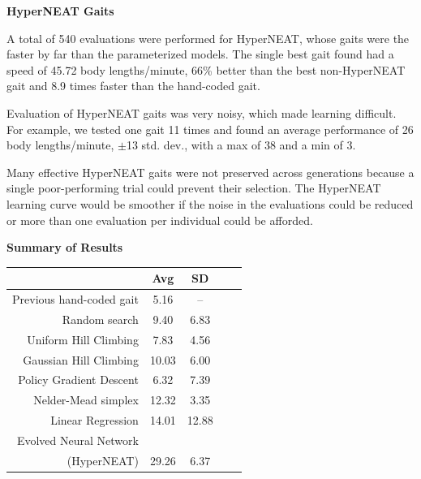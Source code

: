 \documentclass[portrait,final]{baposter}
\begin{document}
\begin{poster}
{


\textbf{HyperNEAT Gaits}
\vspace{.5em}

\noindent A total of 540 evaluations were performed for HyperNEAT, whose gaits
were the faster by far than the parameterized models.  The single best
gait found had a speed of 45.72 body lengths/minute, 66\% better than
the best non-HyperNEAT gait and 8.9 times faster than the hand-coded
gait.

Evaluation of HyperNEAT gaits was very noisy, which made learning
difficult. For example, we tested one gait 11 times and found an average performance of 26
 body lengths/minute, $\pm$13 std. dev., with a max of 38 and a min of 3.

\vspace{.5em}

Many effective HyperNEAT gaits were not preserved across generations
because a single poor-performing trial could prevent their
selection. The HyperNEAT learning curve would be smoother if the noise
in the evaluations could be reduced or more than one evaluation per
individual could be afforded.


\textbf{Summary of Results}
\vspace{.5em}


{\scriptsize
\begin{center}
\begin{tabular}{|r|c|c|c||c|}
\hline
                                         & Avg & SD \\
\hline                                    
\hline                                    
Previous hand-coded gait                 & 5.16   &   --     \\
\hline
Random search                            & 9.40   &   6.83   \\
\hline
Uniform Hill Climbing             & 7.83   &   4.56   \\
\hline
Gaussian Hill Climbing            & 10.03  &   6.00   \\
\hline
Policy Gradient Descent                  & 6.32   &   7.39   \\
\hline
Nelder-Mead simplex                      & 12.32  &   3.35   \\
\hline
Linear Regression                        & 14.01  &  12.88   \\
\hline
Evolved Neural Network              &        &          \\
(HyperNEAT)                              & 29.26  &   6.37   \\
\hline
\end{tabular}
\vspace{.5em}\\
  
\end{center}
}

}
\end{poster}
\end{document}
